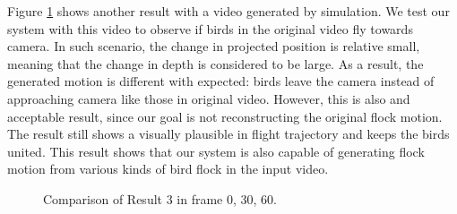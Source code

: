 Figure \ref{figure:result3_com} shows another result with a video generated by simulation. We test our system with this video to observe if birds in the original video fly towards camera. In such scenario, the change in projected position is relative small, meaning that the change in depth is considered to be large. As a result, the generated motion is different with expected: birds leave the camera instead of approaching camera like those in original video. However, this is also and acceptable result, since our goal is not reconstructing the original flock motion. The result still shows a visually plausible in flight trajectory and keeps the birds united. This result shows that our system is also capable of generating flock motion from various kinds of bird flock in the input video.


\begin{figure}[h]
\begin{center}
\hspace{\fill}
\hspace{\fill}


\hspace{\fill}
\hspace{\fill}


\hspace{\fill}
\hspace{\fill}
\end{center}
\caption{Comparison of Result 3 in frame 0, 30, 60.}
\label{figure:result3_com}
\end{figure}